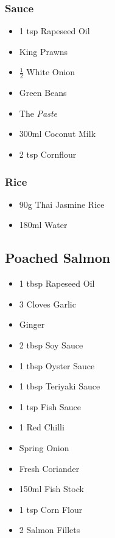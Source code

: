 \documentclass[11pt, english]{article}
\begin{document}
		\subsubsection*{Sauce}

	\begin{itemize}
        \setlength\itemsep{0cm}
                \item 1 tsp Rapeseed Oil
		\item King Prawns
		\item $\frac{1}{2}$ White Onion
		\item Green Beans
		\item The \textit{Paste}
		\item 300ml Coconut Milk
		\item 2 tsp Cornflour
        \end{itemize}

		\subsubsection*{Rice}

	\begin{itemize}
        \setlength\itemsep{0cm}
                \item 90g Thai Jasmine Rice
		\item 180ml Water
        \end{itemize}

\newpage

	\subsection{Poached Salmon}

	\begin{itemize}
        \setlength\itemsep{0cm}
                \item 1 tbsp Rapeseed Oil
		\item 3 Cloves Garlic
		\item Ginger
		\item 2 tbsp Soy Sauce
		\item 1 tbsp Oyster Sauce
		\item 1 tbsp Teriyaki Sauce
		\item 1 tsp Fish Sauce
		\item 1 Red Chilli
		\item Spring Onion
		\item Fresh Coriander
		\item 150ml Fish Stock
		\item 1 tsp Corn Flour
		\item 2 Salmon Fillets
        \end{itemize}
\end{document}
